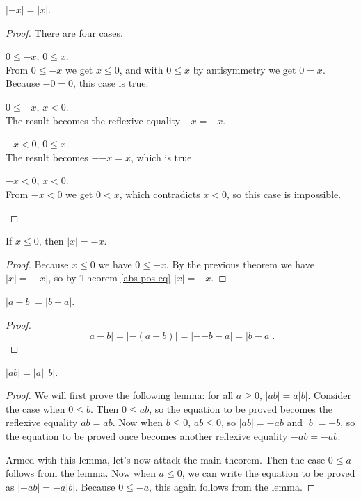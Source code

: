 \documentclass[../math.tex]{subfiles}
\begin{document}
\begin{theorem}
    $|{-x}| = |x|$.
\end{theorem}
\begin{proof}
    There are four cases.
    \begin{case} $0 \leq -x$, $0 \leq x$. \\
        From $0 \leq -x$ we get $x \leq 0$, and with $0 \leq x$ by antisymmetry
        we get $0 = x$.  Because $-0 = 0$, this case is true.
    \end{case}
    \begin{case} $0 \leq -x$, $x < 0$. \\
        The result becomes the reflexive equality $-x = -x$.
    \end{case}
    \begin{case} $-x < 0$, $0 \leq x$. \\
        The result becomes $-{-x} = x$, which is true.
    \end{case}
    \begin{case} $-x < 0$, $x < 0$. \\
        From $-x < 0$ we get $0 < x$, which contradicts $x < 0$, so this case is
        impossible.
    \end{case}
\end{proof}

\begin{theorem}
    If $x \leq 0$, then $|x| = -x$.
\end{theorem}
\begin{proof}
    Because $x \leq 0$ we have $0 \leq -x$.  By the previous theorem we have
    $|x| = |{-x}|$, so by Theorem \ref{abs-pos-eq} $|x| = -x$.
\end{proof}

\begin{theorem}
    $|a - b| = |b - a|$.
\end{theorem}
\begin{proof}
    \[
        |a - b| = |{-(a - b)}| = |{-{-b}} - a| = |b - a|.
    \]
\end{proof}

\begin{theorem}
    $|ab| = |a|\,|b|$.
\end{theorem}
\begin{proof}
    We will first prove the following lemma: for all $a \geq 0$, $|ab| = a|b|$.
    Consider the case when $0 \leq b$.  Then $0 \leq ab$, so the equation to be
    proved becomes the reflexive equality $ab = ab$.  Now when $b \leq 0$, $ab
    \leq 0$, so $|ab| = -ab$ and $|b| = -b$, so the equation to be proved once
    becomes another reflexive equality $-ab = -ab$.

    Armed with this lemma, let's now attack the main theorem.  Then the case $0
    \leq a$ follows from the lemma.  Now when $a \leq 0$, we can write the
    equation to be proved as $|-ab| = -a|b|$.  Because $0 \leq -a$, this again
    follows from the lemma.
\end{proof}
\end{document}
